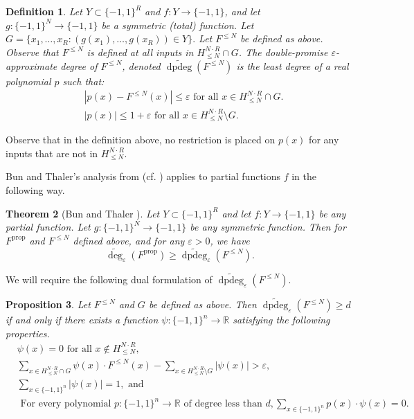 \documentclass[11pt, letterpaper, fleqn]{article}
\newtheorem{theorem}{Theorem}
\newtheorem{definition}[theorem]{Definition}
\newtheorem{proposition}[theorem]{Proposition}
\theoremstyle{plain}
\newcommand{\R}{\mathbb{R}}
\newcommand{\bits}{\{-1,1\}}
\newcommand{\eps}{\varepsilon}
\newcommand{\adeg}{\widetilde{\operatorname{deg}}}
\newcommand{\dpdeg}{\widetilde{\operatorname{dpdeg}}}
\begin{document}
\begin{definition} \label{thisisreallyaproblem}
Let $Y \subset \bits^R$ and $f \colon Y \to \bits$,
and let $g \colon \bits^N \to \bits$ be a symmetric (total) function.
Let $G = \{x_1, \dots, x_R \colon (g(x_1), \dots, g(x_R)) \in Y\}.$
Let $F^{\le N}$ be defined as above.
Observe that $F^{\le N}$ is defined at all inputs 
in $H_{\leq N}^{N \cdot R} \cap G$.
The double-promise $\eps$-approximate degree of $F^{\le N}$,
denoted $\dpdeg(F^{\le N})$
is the least degree of a real polynomial $p$ such that:
\begin{align}
& |p(x) - F^{\le N}(x)| \leq \eps \text{ for all } x \in H_{\leq N}^{N \cdot R} \cap G.\\
& |p(x)| \leq  1+\eps \text{ for all } x \in  H_{\leq N}^{N \cdot R} \setminus G.
\end{align}
\end{definition}
Observe that in the definition above, no restriction is placed on $p(x)$
for any inputs that are not in $H_{\leq N}^{N \cdot R}$.
\medskip

Bun and Thaler's analysis from \cite{adegsurj} (cf. ) applies to partial functions $f$ in the following way. 
\begin{theorem}[Bun and Thaler \cite{adegsurj}] \label{thm:main-reductionpartial}
Let $Y \subset \bits^R$ and let $f : Y \to \bits$ be any partial function. Let $g : \bits^N \to \bits$ be any symmetric function. Then for $F^{\operatorname{prop}}$ and $F^{\le N}$ defined above, and for any $\eps > 0$, we have
\[\adeg_\eps(F^{\operatorname{prop}}) \ge \dpdeg_\eps(F^{\le N}).\]
\end{theorem}
  
We will require the following dual formulation of $\dpdeg_{\eps}(F^{\le N})$. 

\begin{proposition} \label{prop:dualitydiedie}
Let $F^{\le N}$ and $G$ be defined as above. Then $\dpdeg_{\eps}(F^{\le N}) \geq d$ if and only if there exists a function 
$\psi \colon \bits^n \to \R$ satisfying the following properties.
\begin{align}\label{eq:ub-zerodp} &\psi(x) = 0 \text{ for all } x \not\in H_{\leq N}^{N \cdot R}, \\
\label{eq:corrdp} &\sum_{x \in H_{\leq N}^{N \cdot R} \cap G}\psi(x) \cdot F^{\le N}(x) - \sum_{x \in H_{\leq N}^{N \cdot R} \setminus G} |\psi(x)| > \eps, \\
 \label{eq:unitnormdp} &\sum_{x \in \bits^n} |\psi(x)| = 1, \text{ and }  \\
 \label{eq:phddp} &\text{ For every polynomial } p \colon \bits^n \to \R \text{ of degree less than } d, \sum_{x \in \bits^n} p(x) \cdot \psi(x) = 0. 
\end{align}
\end{proposition}
\end{document}
